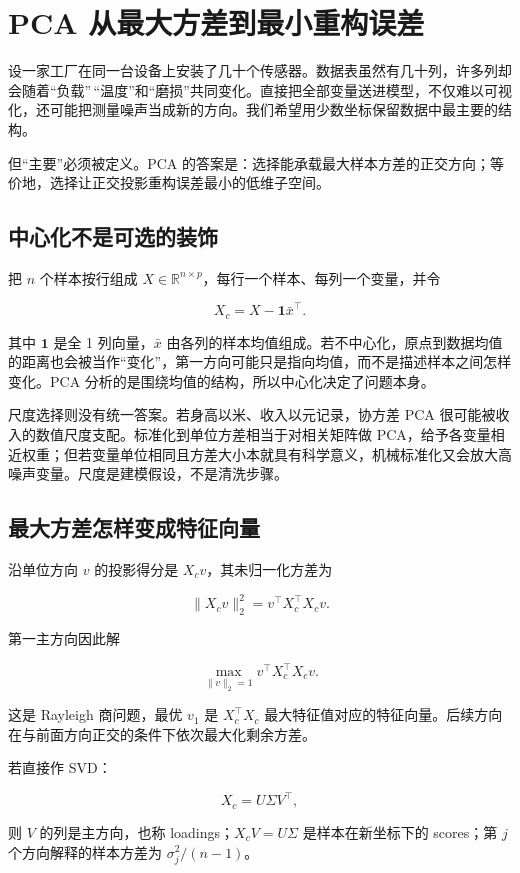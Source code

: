 \section{PCA 从最大方差到最小重构误差}

设一家工厂在同一台设备上安装了几十个传感器。数据表虽然有几十列，许多列却会随着``负载''\,``温度''和``磨损''共同变化。直接把全部变量送进模型，不仅难以可视化，还可能把测量噪声当成新的方向。我们希望用少数坐标保留数据中最主要的结构。

但``主要''必须被定义。PCA 的答案是：选择能承载最大样本方差的正交方向；等价地，选择让正交投影重构误差最小的低维子空间。

\subsection{中心化不是可选的装饰}

把 \(n\) 个样本按行组成 \(X\in\mathbb R^{n\times p}\)，每行一个样本、每列一个变量，并令

\[
X_c=X-\mathbf 1\bar x^\top.
\]

其中 \(\mathbf 1\) 是全 1 列向量，\(\bar x\) 由各列的样本均值组成。若不中心化，原点到数据均值的距离也会被当作``变化''，第一方向可能只是指向均值，而不是描述样本之间怎样变化。PCA 分析的是围绕均值的结构，所以中心化决定了问题本身。

尺度选择则没有统一答案。若身高以米、收入以元记录，协方差 PCA 很可能被收入的数值尺度支配。标准化到单位方差相当于对相关矩阵做 PCA，给予各变量相近权重；但若变量单位相同且方差大小本就具有科学意义，机械标准化又会放大高噪声变量。尺度是建模假设，不是清洗步骤。

\subsection{最大方差怎样变成特征向量}

沿单位方向 \(v\) 的投影得分是 \(X_cv\)，其未归一化方差为

\[
\|X_cv\|_2^2
=v^\top X_c^\top X_cv.
\]

第一主方向因此解

\[
\max_{\|v\|_2=1}v^\top X_c^\top X_cv.
\]

这是 Rayleigh 商问题，最优 \(v_1\) 是 \(X_c^\top X_c\) 最大特征值对应的特征向量。后续方向在与前面方向正交的条件下依次最大化剩余方差。

若直接作 SVD：

\[
X_c=U\Sigma V^\top,
\]

则 \(V\) 的列是主方向，也称 loadings；\(X_cV=U\Sigma\) 是样本在新坐标下的 scores；第 \(j\) 个方向解释的样本方差为 \(\sigma_j^2/(n-1)\)。

